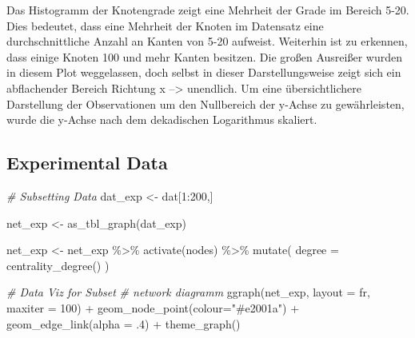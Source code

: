 \documentclass[
  12 pt,
]{article}
\newenvironment{Shaded}{\begin{snugshade}}{\end{snugshade}}
\newcommand{\AttributeTok}[1]{\textcolor[rgb]{0.77,0.63,0.00}{#1}}
\newcommand{\CommentTok}[1]{\textcolor[rgb]{0.56,0.35,0.01}{\textit{#1}}}
\newcommand{\DecValTok}[1]{\textcolor[rgb]{0.00,0.00,0.81}{#1}}
\newcommand{\FunctionTok}[1]{\textcolor[rgb]{0.00,0.00,0.00}{#1}}
\newcommand{\NormalTok}[1]{#1}
\newcommand{\OtherTok}[1]{\textcolor[rgb]{0.56,0.35,0.01}{#1}}
\newcommand{\SpecialCharTok}[1]{\textcolor[rgb]{0.00,0.00,0.00}{#1}}
\newcommand{\StringTok}[1]{\textcolor[rgb]{0.31,0.60,0.02}{#1}}
\begin{document}
Das Histogramm der Knotengrade zeigt eine Mehrheit der Grade im Bereich
5-20. Dies bedeutet, dass eine Mehrheit der Knoten im Datensatz eine
durchschnittliche Anzahl an Kanten von 5-20 aufweist. Weiterhin ist zu
erkennen, dass einige Knoten 100 und mehr Kanten besitzen. Die großen
Ausreißer wurden in diesem Plot weggelassen, doch selbst in dieser
Darstellungsweise zeigt sich ein abflachender Bereich Richtung x
--\textgreater{} unendlich. Um eine übersichtlichere Darstellung der
Observationen um den Nullbereich der y-Achse zu gewährleisten, wurde die
y-Achse nach dem dekadischen Logarithmus skaliert.

\hypertarget{experimental-data}{%
\subsection{Experimental Data}\label{experimental-data}}

\begin{Shaded}
\begin{Highlighting}[]
\CommentTok{\# Subsetting Data}
\NormalTok{dat\_exp }\OtherTok{\textless{}{-}}\NormalTok{ dat[}\DecValTok{1}\SpecialCharTok{:}\DecValTok{200}\NormalTok{,]}

\NormalTok{net\_exp }\OtherTok{\textless{}{-}} \FunctionTok{as\_tbl\_graph}\NormalTok{(dat\_exp)}

\NormalTok{net\_exp }\OtherTok{\textless{}{-}}\NormalTok{ net\_exp }\SpecialCharTok{\%\textgreater{}\%} 
  \FunctionTok{activate}\NormalTok{(nodes) }\SpecialCharTok{\%\textgreater{}\%} 
  \FunctionTok{mutate}\NormalTok{(}
    \AttributeTok{degree =} \FunctionTok{centrality\_degree}\NormalTok{()}
\NormalTok{  )}
\end{Highlighting}
\end{Shaded}

\begin{Shaded}
\begin{Highlighting}[]
\CommentTok{\# Data Viz for Subset}
\CommentTok{\# network diagramm}
\FunctionTok{ggraph}\NormalTok{(net\_exp, }\AttributeTok{layout =} \StringTok{\textquotesingle{}fr\textquotesingle{}}\NormalTok{, }\AttributeTok{maxiter =} \DecValTok{100}\NormalTok{) }\SpecialCharTok{+} 
  \FunctionTok{geom\_node\_point}\NormalTok{(}\AttributeTok{colour=}\StringTok{"\#e2001a"}\NormalTok{) }\SpecialCharTok{+} 
  \FunctionTok{geom\_edge\_link}\NormalTok{(}\AttributeTok{alpha =}\NormalTok{ .}\DecValTok{4}\NormalTok{) }\SpecialCharTok{+}
  \FunctionTok{theme\_graph}\NormalTok{()}
\end{Highlighting}
\end{Shaded}
\end{document}
